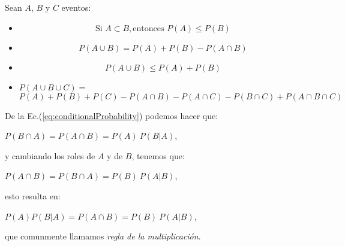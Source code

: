 \begin{tcolorbox}[colback=gray!5!white,colframe=gray!60!black,title=Resumen: Propiedades de las leyes de la probabilidad]
    Sean $A$, $B$ y $C$ eventos:

    \begin{itemize}
        \item
        \begin{equation}
            \text{Si } A \subset B, \text{entonces } P(A) \leq P(B)
            \label{eq:propProb1}
        \end{equation}
        
        \item 
        \begin{equation}
        P(A \cup B) = P(A) + P(B) - P(A \cap B)
        \label{eq:propProb2}
        \end{equation}

        \item 
        \begin{equation}
            P(A \cup B) \leq P(A) + P(B)
            \label{eq:propProb3}
        \end{equation}

    \item
    $P(A \cup B \cup C)=$
    \begin{equation}
        P(A) + P(B) + P(C) - P(A \cap B) - P(A \cap C) - 
        P(B \cap C) + P(A \cap B \cap C)
        \label{eq:propProb4}
    \end{equation}
    \end{itemize}
\end{tcolorbox}

De la Ec.(\ref{eq:conditionalProbability}) podemos hacer que:

\begin{center}
$P(B \cap A) = P(A \cap B) = P(A) \  P(B|A)$, 
\end{center}

y cambiando los roles de $A$ y de $B$, tenemos que:

\begin{center}
    $P(A \cap B) = P(B \cap A) = P(B) \ P(A|B)$, 
\end{center}

esto resulta en:

\begin{center}
    $P(A)P(B|A) = P(A \cap B) = P(B) \ P(A|B)$,
\end{center}

que comunmente llamamos \textit{regla de la multiplicación}.

